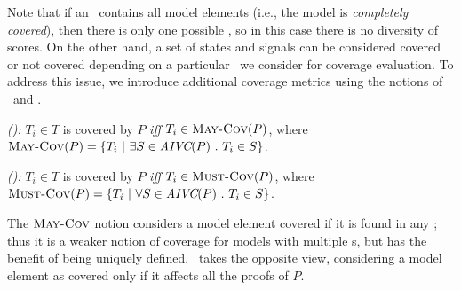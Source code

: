 \noindent Note that if an \mivc ~contains all model elements (i.e., the model is {\em completely covered}), then there is only one possible \mivc , so in this case there is no diversity of scores. On the other hand, a set of states and signals can be considered covered or not covered depending on a particular \mivc\ we consider for coverage evaluation. To address this issue, we introduce additional coverage metrics using the notions of \may\ and \must.


\begin{definition} {\emph{(\maycov):}}
  \label{def:comp-1}
 $T_i \in T$ is covered by $P$ \emph{iff} $T_i \in \text{\sc May-Cov} (P)$, where
   $\text{\sc May-Cov} (P) = \{T_i ~|~ \exists S \in \textit{AIVC}(P)~.~T_i \in S \}$.
\end{definition}

\begin{definition} {\emph{(\mustcov):}}
  \label{def:mustcov}
 $T_i \in T$ is covered by $P$ \emph{iff} $T_i \in \text{\sc Must-Cov} (P)$, where
   $\text{\sc Must-Cov} (P) = \{T_i ~|~ \forall S \in \textit{AIVC}(P)~.~T_i \in S \}$.
\end{definition}

The $\text{\sc May-Cov}$ notion considers a model element covered if it is found in any \mivc ; thus it is a weaker notion of coverage for models with multiple \mivc s, but has the benefit of being uniquely defined.  \mustcov\ takes the opposite view, considering a model element as covered only if it affects all the proofs of $P$.

